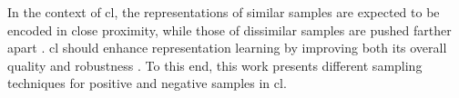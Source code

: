 In the context of \acf{cl}, 
the representations of similar samples are expected to be encoded in close proximity, 
while those of dissimilar samples are pushed farther apart 
\citet{mining_potential_2024}.
\ac{cl} should enhance representation learning 
by improving both its overall quality and robustness \citet{mochi_2020}.
To this end, this work presents different sampling techniques for 
positive and negative samples in \ac{cl}.